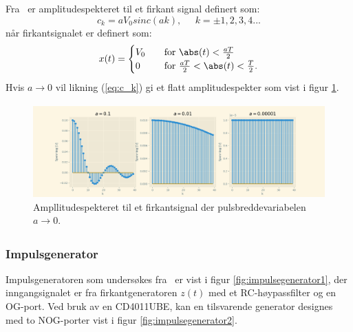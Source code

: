 \documentclass[a4paper,11pt,norsk]{article}
\begin{document}
Fra~\cite{oving6} er amplitudespekteret til et firkant signal definert som:
\begin{equation}
\label{eq:c_k}
    c_k=aV_0sinc(ak),\;\;\;\;\;k=\pm1,2,3,4...
\end{equation}
når firkantsignalet er definert som:
\[ x(t) =
  \begin{cases}
    V_0       & \quad \text{for } \abs(t) < \frac{aT}{2}\\
    0  & \quad \text{for } \frac{aT}{2}< \abs(t) < \frac{T}{2}.
  \end{cases}
\]
Hvis $a \xrightarrow[]{} 0$ vil likning (\ref{eq:c_k}) gi et flatt amplitudespekter som vist i figur \ref{fig:ideeltamplitudespekter}.
\begin{figure}[H]
  \centering
  \includegraphics[scale=0.4]{D1/Images/amplitudespekter.png}
  \caption{Ampllitudespekteret til et firkantsignal der pulsbreddevariabelen $a \xrightarrow[]{} 0$.}
  \label{fig:ideeltamplitudespekter}
\end{figure}

\subsubsection{Impulsgenerator}
\label{sec:impulsgenerator}

Impulsgeneratoren som undersøkes fra~\cite{Eksamensprosjekt} er vist i figur \ref{fig:impulsegenerator1}, der inngangsignalet er fra firkantgeneratoren $z(t)$ med et RC-høypassfilter og en OG-port. Ved bruk av en  CD4011UBE, kan en tilsvarende generator designes med to NOG-porter vist i figur \ref{fig:impulsegenerator2}.
\end{document}
